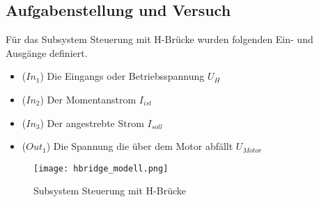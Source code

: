 \subsection{Aufgabenstellung und Versuch}

Für das Subsystem Steuerung mit H-Brücke wurden folgenden Ein- und Ausgänge
definiert.\\

\begin{itemize}
    \item ($In_1$) Die Eingangs oder Betriebsspannung $U_H$
    \item ($In_2$) Der Momentanstrom $I_{ist}$
    \item ($In_3$) Der angestrebte Strom $I_{soll}$
    \item ($Out_1$) Die Spannung die über dem Motor abfällt $U_{Motor}$
\end{itemize}


\begin{figure}[H]
    \centering
    \texttt{[image: hbridge\_modell.png]}
    \caption{Subsystem Steuerung mit H-Brücke}
    \label{fig:Subsystem H-Bridge}
\end{figure}